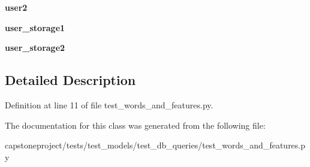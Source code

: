 \begin{DoxyCompactItemize}
{\bfseries user2}
\item 
\mbox{\label{classcapstoneproject_1_1tests_1_1test__models_1_1test__db__queries_1_1test__words__and__featuresa2b06c902a13d9605b75d663fed77bb7_a23b2f8e7fea0fd4fdee336dc64d49c1b}} 
{\bfseries user\+\_\+storage1}
\item 
\mbox{\label{classcapstoneproject_1_1tests_1_1test__models_1_1test__db__queries_1_1test__words__and__featuresa2b06c902a13d9605b75d663fed77bb7_a5346b3b9602aa35bace071a02bcdb83e}} 
{\bfseries user\+\_\+storage2}
\end{DoxyCompactItemize}


\subsection{Detailed Description}


Definition at line 11 of file test\+\_\+words\+\_\+and\+\_\+features.\+py.



The documentation for this class was generated from the following file\+:\begin{DoxyCompactItemize}
\item 
capstoneproject/tests/test\+\_\+models/test\+\_\+db\+\_\+queries/test\+\_\+words\+\_\+and\+\_\+features.\+py\end{DoxyCompactItemize}
